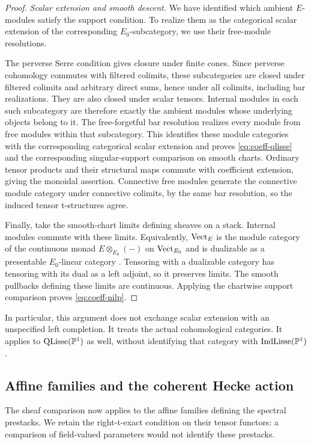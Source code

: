 \begin{proof}
\emph{Scalar extension and smooth descent.}
We have identified which ambient $E$-modules satisfy the support
condition. To realize them as the categorical scalar extension of
the corresponding $E_0$-subcategory, we use their free-module
resolutions.

The perverse Serre condition gives closure under finite cones.
Since perverse cohomology commutes with filtered colimits, these
subcategories are closed under filtered colimits and arbitrary direct
sums, hence under all colimits, including bar realizations. They are also
closed under scalar tensors. Internal modules in each
such subcategory are therefore exactly the ambient modules whose
underlying objects belong to it. The free-forgetful bar resolution
realizes every module from free modules within that subcategory.
This identifies these module categories with the corresponding categorical scalar
extension and proves \eqref{eq:coeff-qlisse} and the corresponding
singular-support comparison on smooth charts. Ordinary tensor products
and their structural maps commute with coefficient extension, giving
the monoidal assertion. Connective free modules generate the
connective module category under connective colimits, by the same bar
resolution, so the induced tensor t-structures agree.

Finally, take the smooth-chart limits defining sheaves on a stack.
Internal modules commute with these limits. Equivalently,
$\operatorname{Vect}_E$ is the module category of the continuous monad
$E\otimes_{E_0}(-)$ on $\operatorname{Vect}_{E_0}$ and is dualizable as a presentable
$E_0$-linear category \cite[Lemma~1.6.3]{GKRV}. Tensoring with a
dualizable category has tensoring with its dual as a left adjoint,
so it preserves limits. The smooth pullbacks defining these limits
are continuous. Applying the
chartwise support comparison proves \eqref{eq:coeff-nilp}.
\end{proof}

In particular, this argument does not exchange scalar extension with
an unspecified left completion. It treats the actual cohomological
categories. It applies to $\operatorname{QLisse}(\mathbb P^1)$ as well, without
identifying that category with $\operatorname{IndLisse}(\mathbb P^1)$.

\subsection{Affine families and the coherent Hecke action}

The sheaf comparison now applies to the affine families defining the
spectral prestacks. We retain the right-t-exact condition on their
tensor functors: a comparison of field-valued parameters would not
identify these prestacks.

